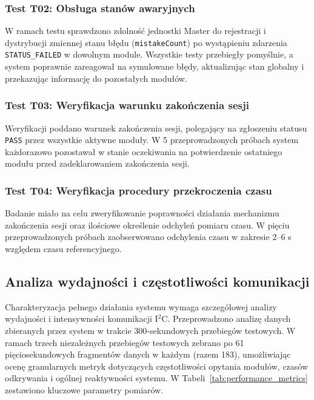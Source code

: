 \documentclass{SGGW-thesis}
\begin{document}
\subsubsection{Test T02: Obsługa stanów awaryjnych}
W ramach testu sprawdzono zdolność jednostki Master do rejestracji i dystrybucji zmiennej stanu błędu (\texttt{mistakeCount}) po wystąpieniu zdarzenia \texttt{STATUS\_FAILED} w dowolnym module. Wszystkie testy przebiegły pomyślnie, a system poprawnie zareagował na symulowane błędy, aktualizując stan globalny i przekazując informację do pozostałych modułów.

\subsubsection{Test T03: Weryfikacja warunku zakończenia sesji}
Weryfikacji poddano warunek zakończenia sesji, polegający na zgłoszeniu statusu \texttt{PASS} przez wszystkie aktywne moduły. W 5 przeprowadzonych próbach system każdorazowo pozostawał w stanie oczekiwania na potwierdzenie ostatniego modułu przed zadeklarowaniem zakończenia sesji.

\subsubsection{Test T04: Weryfikacja procedury przekroczenia czasu}
Badanie miało na celu zweryfikowanie poprawności działania mechanizmu zakończenia sesji oraz ilościowe określenie odchyleń pomiaru czasu. W pięciu przeprowadzonych próbach zaobserwowano odchylenia czasu w zakresie 2–6 s względem czasu referencyjnego.

\subsection{Analiza wydajności i częstotliwości komunikacji}

Charakteryzacja pełnego działania systemu wymaga szczegółowej analizy wydajności i intensywności komunikacji I$^2$C. Przeprowadzono analizę danych zbieranych przez system w trakcie 300-sekundowych przebiegów testowych. W ramach trzech niezależnych przebiegów testowych zebrano po 61 pięciosekundowych fragmentów danych w każdym (razem 183), umożliwiając ocenę granularnych metryk dotyczących częstotliwości opytania modułów, czasów odkrywania i ogólnej reaktywności systemu. W Tabeli~\ref{tab:performance_metrics} zestawiono kluczowe parametry pomiarów.
\end{document}
